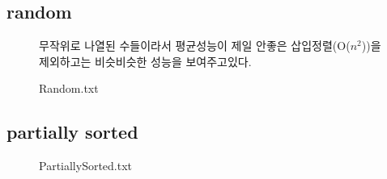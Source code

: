 \documentclass[a4paper,11pt]{article}
\begin{document}
\subsection{random}
\begin{figure}[h]
\caption{Random.txt}
\label{fig:fig1}

무작위로 나열된 수들이라서 평균성능이 제일 안좋은 삽입정렬(O($n^2$))을 제외하고는 비슷비슷한 성능을 보여주고있다.
\end{figure}
\subsection{partially sorted}
\begin{figure}[h]
\caption{PartiallySorted.txt}
\label{fig:fig2}
\end{figure}
\end{document}

